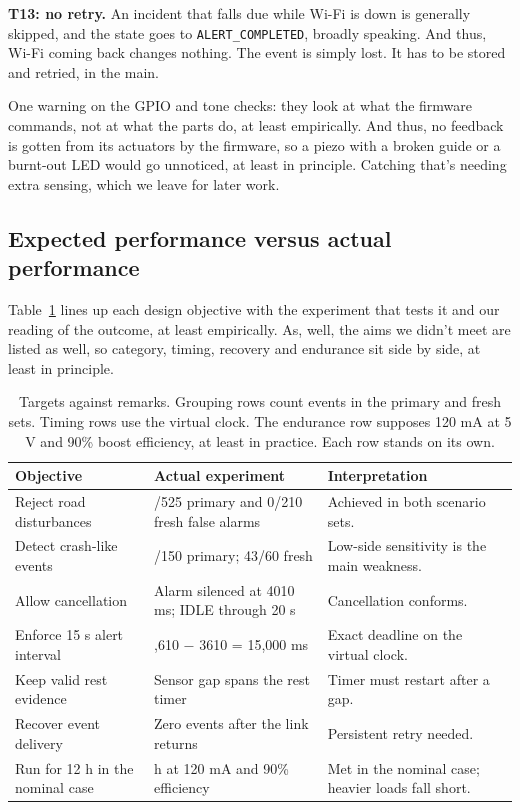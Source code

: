 \documentclass[10pt,a4paper]{article}
\begin{document}
\textbf{T13: no retry.} An incident that falls due while Wi-Fi is down is generally skipped, and the state goes to \texttt{ALERT\_COMPLETED}, broadly speaking. And thus, Wi-Fi coming back changes nothing. The event is simply lost. It has to be stored and retried, in the main.

One warning on the GPIO and tone checks: they look at what the firmware commands, not at what the parts do, at least empirically. And thus, no feedback is gotten from its actuators by the firmware, so a piezo with a broken guide or a burnt-out LED would go unnoticed, at least in principle. Catching that's needing extra sensing, which we leave for later work.

\subsection{Expected performance versus actual performance}
Table~\ref{tab:goals} lines up each design objective with the experiment that tests it and our reading of the outcome, at least empirically. As, well, the aims we didn't meet are listed as well, so category, timing, recovery and endurance sit side by side, at least in principle.

\begin{table}[H]\centering\small\caption{Targets against remarks. Grouping rows count events in the primary and fresh sets. Timing rows use the virtual clock. The endurance row supposes 120 mA at 5 V and 90\% boost efficiency, at least in practice. Each row stands on its own.}\label{tab:goals}
\begin{tabularx}{\linewidth}{|>{\raggedright\arraybackslash}p{.26\linewidth}|>{\raggedright\arraybackslash}p{.36\linewidth}|X|}\hline
\textbf{Objective} & \textbf{Actual experiment} & \textbf{Interpretation}\\\hline
Reject road disturbances & 0/525 primary and 0/210 fresh false alarms & Achieved in both scenario sets.\\\hline
Detect crash-like events & 114/150 primary; 43/60 fresh & Low-side sensitivity is the main weakness.\\\hline
Allow cancellation & Alarm silenced at 4010 ms; IDLE through 20 s & Cancellation conforms.\\\hline
Enforce 15 s alert interval & 18,610 $-$ 3610 = 15,000 ms & Exact deadline on the virtual clock.\\\hline
Keep valid rest evidence & Sensor gap spans the rest timer & Timer must restart after a gap.\\\hline
Recover event delivery & Zero events after the link returns & Persistent retry needed.\\\hline
Run for 12 h in the nominal case & 12.64 h at 120 mA and 90\% efficiency & Met in the nominal case; heavier loads fall short.\\\hline
\end{tabularx}\end{table}
\end{document}
